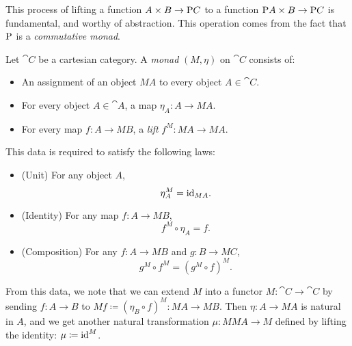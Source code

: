 \documentclass[DynamicalBook]{subfiles}
\begin{document}
This process of lifting a function $A \times B \to \mathrm{P} C$ to a function
$\mathrm{P} A \times B \to \mathrm{P} C$ is fundamental, and worthy of abstraction.
This operation comes from the fact that $\mathrm{P}$ is a \emph{commutative monad}.
\begin{definition}\label{def.commutative_monad}
Let $\cat{C}$ be a cartesian category. A \emph{monad} $(M, \eta)$ on $\cat{C}$ consists of:
\begin{itemize}
  \item An assignment of an object $MA$ to every object $A \in \cat{C}$.
  \item For every object $A \in \cat{A}$, a map $\eta_A : A \to MA$.
  \item For every map $f : A \to MB$, a \emph{lift} $f^M : MA \to MA$. 
\end{itemize}
This data is required to satisfy the following laws:
\begin{itemize}
  \item (Unit) For any object $A$, \[\eta_{A}^M = \mathrm{id}_{MA}.\]
  \item (Identity) For any map $f : A \to MB$, \[f^M \circ \eta_A = f.\]
  \item (Composition) For any $f : A \to MB$ and $g : B \to MC$,
\[ g^M \circ f^M = (g^M \circ f)^M.\]
\end{itemize}
From this data, we note that we can extend $M$ into a functor $M : \cat{C} \to
\cat{C}$ by sending $f : A \to B$ to $Mf \coloneqq (\eta_B \circ f)^M : MA \to
MB$.
Then $\eta : A \to MA$ is natural in $A$, and we get another natural
transformation $\mu : MM A \to M$ defined by lifting the identity: $\mu \coloneqq \mathrm{id}^M$.


\end{definition}
\end{document}
